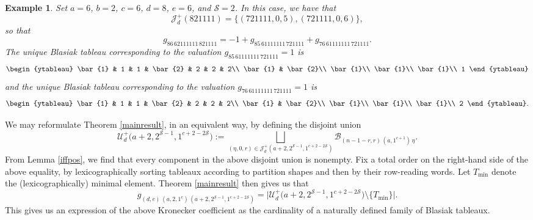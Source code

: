 \documentclass[12pt]{article}
\newtheorem{example}{Example}
\begin{document}
\begin{example}\label{exaftermain}
 Set $a = 6$, $b = 2$, $c = 6$, $d = 8$, $e = 6$, and $\mathcal{S} = 2$. In this case, we have that $$ \mathcal{J}_{d}^{+}(821111) = 
 \big\{ (721111, 0, 5), (721111, 0, 6) \big\}, $$ so that $$ g_{86 \, 62111111 \, 821111} = - 1 + g_{85 \, 61111111 \, 721111} + g_{76 \, 
 61111111 \, 721111}. $$ The unique Blasiak tableau corresponding to the valuation 
 $g_{85 \, 61111111 \, 721111} = 1$ is
 $$ { \begin{ytableau} \bar{1} & 1 & 1 & \bar{2} & 2 & 2 & 2\\ \bar{1} & \bar{2}\\ \bar{1}\\ \bar{1}\\ \bar{1}\\ 1 \end{ytableau}} $$
 and the unique Blasiak tableau corresponding to the valuation 
 $g_{76 \, 61111111 \, 721111} = 1$ is 
 $$ \begin{ytableau} \bar{1} & 1 & 1 & \bar{2} & 2 & 2 & 2\\ \bar{1} & \bar{2}\\ \bar{1}\\ \bar{1}\\ \bar{1}\\ 2 \end{ytableau}. $$
\end{example}

 We may reformulate Theorem \ref{mainresult}, in an equivalent way, by defining the disjoint union 
\begin{equation*}
 \mathcal{U}_{d}^{+}\big( a + 2, 2^{\mathcal{S} - 1}, 1^{c+2-2\mathcal{S}} \big) 
 := \bigsqcup_{ (\eta, 0, r) \in \mathcal{J}_{d}^{+}( a + 2, 2^{\mathcal{S} - 1}, 
 1^{c + 2 - 2 \mathcal{S}} ) } 
 \mathcal{B}_{(n - 1 - r, r) \, (a, 1^{c+1}) \, \eta }. 
\end{equation*}
 From Lemma \ref{iffpos}, we find that every component in the above disjoint union is nonempty.
 Fix a total order on the right-hand side of the above equality, 
 by lexicographically sorting tableaux according to partition shapes
 and then by their row-reading words. Let $T_{\operatorname{min}}$ denote the 
 (lexicographically) minimal element. Theorem \ref{mainresult} then gives us that 
 $$ g_{(d, e) \, (a, 2, 1^{c}) \, (a+2, 2^{\mathcal{S} -1}, 1^{c+2-2\mathcal{S}} ) } 
 = \big| \mathcal{U}_{d}^{+}\big( a + 2, 2^{\mathcal{S} - 1}, 1^{c + 2 - 2 \mathcal{S}} \big) 
 \setminus \{ T_{\operatorname{min}} \} \big|. $$ 
 This gives us an expression of the above Kronecker coefficient 
 as the cardinality of a naturally defined family of Blasiak tableaux. 
 
\end{document}
